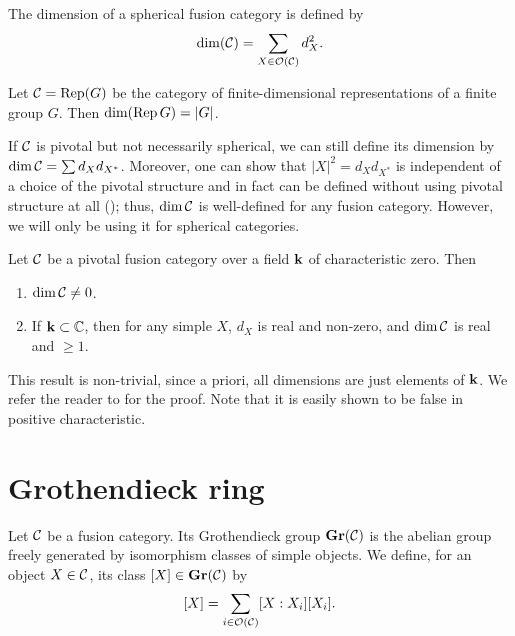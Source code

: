 \begin{definition}
  The dimension of a spherical fusion category is defined by
  $$
    \dim(\mathcal{C})=\sum_{X\in \mathcal{O}(\mathcal{C})} d_X^2.
  $$
\end{definition}

\begin{example}\label{x:dim-repg}
  Let $\mathcal{C}=\operatorname{Rep}(G)$ be the category of finite-dimensional representations of
  a finite group $G$. Then $\dim (\operatorname{Rep} G)=|G|$.
\end{example}

\begin{remark}
  If $\mathcal{C}$ is pivotal but not necessarily spherical, we can still define its
  dimension by $\dim \mathcal{C}=\sum d_X d_{X^*}$. Moreover, one can show that
  $|X|^2=d_X d_{X^*}$ is independent of a choice of the pivotal structure and in
  fact can be defined without using pivotal structure at all
  (\cite[Section 7.21]{etingof-fusion}); thus, $\dim \mathcal{C}$ is well-defined
  for any fusion category. However, we will only be using it for spherical
  categories.
\end{remark}

\begin{theorem}\label{t:dim-nonzero}
  Let $\mathcal{C}$ be a pivotal fusion category over a field $\mathbf{k}$ of
  characteristic zero. Then
  \begin{enumerate}
    \item $\dim \mathcal{C}\ne 0$.
    \item If $\mathbf{k}\subset\mathbb{C}$, then for any simple $X$,
  $d_X$ is real and non-zero, and $\dim \mathcal{C}$ is real and $\ge1$.
  \end{enumerate}
\end{theorem}
This result is non-trivial, since a priori, all dimensions are just elements of
$\mathbf{k}$. We refer the reader to \cite[Theorem 7.21.12]{etingof-fusion} for the
proof. Note that it is easily shown to be false in positive characteristic.

\section{Grothendieck ring}\label{s:grothendieck-ring}
\begin{definition}\label{d:grothendieck}
  Let $\mathcal{C}$ be a fusion category. Its Grothendieck group $\mathbf{Gr}(\mathcal{C})$ is the
  abelian group freely generated by isomorphism classes of simple objects. We
  define, for an object $X\in \mathcal{C}$, its class $[X]\in \mathbf{Gr}(\mathcal{C})$ by
  $$
    [X]=\sum_{i\in \mathcal{O}(\mathcal{C})} [X:X_i] [X_i].
  $$
\end{definition}

